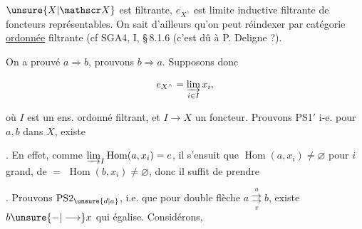 
$\unsure{X|\mathscr X}$ est filtrante, $e_{X^\wedge}$ est limite inductive filtrante de foncteurs représentables. On sait d'ailleurs qu'on peut réindexer par  catégorie \uline{ordonnée} filtrante (cf SGA4, I, \S\,8.1.6 (c'est dû à P. Deligne ?).

On a prouvé $a\Longrightarrow b$, prouvons $b\Longrightarrow a$. Supposons donc

\[
e_{X^\wedge}=\varinjlim_{i\in I}x_i,
\]

où $I$ est un  ens. ordonné filtrant, et $I\longrightarrow X$ un foncteur.  Prouvons PS1$'$  i-e. pour $a,b$ dans $X$, existe


. En effet,  comme  $\varinjlim_I\operatorname{Hom}(a,x_i)=e$, il s'ensuit que $\operatorname{Hom}(a,x_i)\ne\varnothing$ pour $i$ grand, de $=$ $\operatorname{Hom}(b,x_i)\ne\varnothing$, donc il suffit de prendre


. Prouvons $\mathrm{PS2}_{\unsure{d|a}}$, i.e. que pour double flèche $a\overset{u}{\underset{v}{\rightrightarrows}}b$, existe $b\unsure{\mathbin{-}|\longrightarrow}x$ qui égalise. Considérons,



